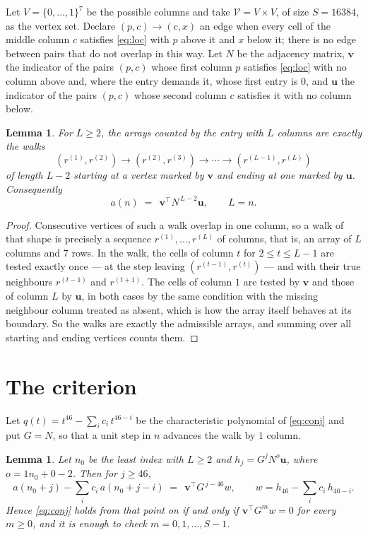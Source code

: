 \documentclass[11pt,a4paper]{article}
\theoremstyle{plain}
\newtheorem{lemma}[theorem]{Lemma}
\theoremstyle{definition}
\begin{document}
Let $V=\{0,\dots,1\}^{7}$ be the possible columns and take
$\mathcal V=V\times V$, of size $S=16384$, as the vertex set. Declare $(p,c)\to(c,x)$ an edge
when every cell of the middle column $c$ satisfies \eqref{eq:loc} with $p$ above it and $x$
below it; there is no edge between pairs that do not overlap in this way. Let $N$ be the
adjacency matrix, $\mathbf{v}$ the indicator of the pairs $(p,c)$ whose first column $p$
satisfies \eqref{eq:loc} with no column above and, where the entry demands it, whose first entry is $0$, and $\mathbf{u}$ the indicator of
the pairs $(p,c)$ whose second column $c$ satisfies it with no column below.

\begin{lemma}\label{lem:walk}
For $L\ge2$, the arrays counted by the entry with $L$ columns are exactly the walks
\[
(r^{(1)},r^{(2)})\to(r^{(2)},r^{(3)})\to\cdots\to(r^{(L-1)},r^{(L)})
\]
of length $L-2$ starting at a vertex marked by $\mathbf{v}$ and ending at one marked by
$\mathbf{u}$. Consequently
\[
a(n)\;=\;\,\mathbf{v}^{\!\top}N^{\,L-2}\mathbf{u},\qquad L=n .
\]
\end{lemma}

\begin{proof}
Consecutive vertices of such a walk overlap in one column, so a walk of that shape is
precisely a sequence $r^{(1)},\dots,r^{(L)}$ of columns, that is, an array of $L$ columns
and $7$ rows. In the walk, the cells of column $t$ for $2\le t\le L-1$ are tested
exactly once --- at the step leaving $(r^{(t-1)},r^{(t)})$ --- and with their true
neighbours $r^{(t-1)}$ and $r^{(t+1)}$. The cells of column $1$ are tested by
$\mathbf{v}$ and those of column $L$ by $\mathbf{u}$, in both cases by the same condition
with the missing neighbour column treated as absent, which is how the array itself behaves at
its boundary. So the walks are exactly the admissible arrays, and summing over all starting
and ending vertices counts them.
\end{proof}

\section{The criterion}

Let $q(t)=t^{46}-\sum_i c_i\,t^{46-i}$ be the characteristic polynomial of
\eqref{eq:conj} and put $G=N$, so that a unit step in $n$ advances the walk by
$1$ column.

\begin{lemma}\label{lem:crit}
Let $n_0$ be the least index with $L\ge2$ and $h_j=G^{j}N^{o}\mathbf{u}$, where
$o=1n_0+0-2$. Then for $j\ge46$,
\[
a(n_0+j)-\sum_i c_i\,a(n_0+j-i)\;=\;\,\mathbf{v}^{\!\top}G^{\,j-46}w,
\qquad w=h_{46}-\sum_i c_i\,h_{46-i} .
\]
Hence \eqref{eq:conj} holds from that point on if and only if
$\mathbf{v}^{\!\top}G^{m}w=0$ for every $m\ge0$, and it is enough to check
$m=0,1,\dots,S-1$.
\end{lemma}
\end{document}
